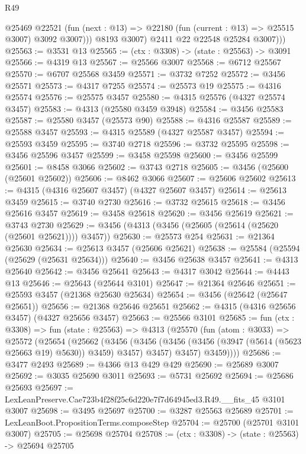 \begin{lexlean}{R49}
\begin{coremodule}
                @25469
                @22521
                (fun (next : @13) => @22180 (fun (current : @13) => @25515 @3007) @3092 @3007)))
            @8193
            @3007)
          @2411
          @22
          @22548
          @25284
          @3007)))
@25563 := @3531 @13
@25565 := (ctx : @3308) -> (state : @25563) -> @3091
@25566 := @4319 @13
@25567 := @25566 @3007
@25568 := @6712 @25567
@25570 := @6707 @25568 @3459
@25571 := @3732 @7252
@25572 := @3456 @25571
@25573 := @4317 @7255
@25574 := @25573 @19
@25575 := @4316 @25574
@25576 := @25575 @3457
@25580 := @4315 @25576 (@4327 @25574 @3457)
@25583 := @4313 (@25580 @3459 @3948)
@25584 := @3456 @25583
@25587 := @25580 @3457 (@25573 @90)
@25588 := @4316 @25587
@25589 := @25588 @3457
@25593 := @4315 @25589 (@4327 @25587 @3457)
@25594 := @25593 @3459
@25595 := @3740 @2718
@25596 := @3732 @25595
@25598 := @3456 @25596 @3457
@25599 := @3458 @25598
@25600 := @3456 @25599
@25601 := @8458 @3066
@25602 := @3743 @2718
@25605 := @3456 (@25600 (@25601 @25602))
@25606 := @8462 @3066
@25607 := @25606 @25602
@25613 := @4315 (@4316 @25607 @3457) (@4327 @25607 @3457)
@25614 := @25613 @3459
@25615 := @3740 @2730
@25616 := @3732 @25615
@25618 := @3456 @25616 @3457
@25619 := @3458 @25618
@25620 := @3456 @25619
@25621 := @3743 @2730
@25629 := @3456 (@4313 (@3456 (@25605 (@25614 (@25620 (@25601 @25621)))) @3457))
@25630 := @25573 @254
@25631 := @21364 @25630
@25634 := @25613 @3457 (@25606 @25621)
@25638 := @25584 (@25594 (@25629 (@25631 @25634)))
@25640 := @3456 @25638 @3457
@25641 := @4313 @25640
@25642 := @3456 @25641
@25643 := @4317 @3042
@25644 := @4443 @13
@25646 := @25643 (@25644 @3101)
@25647 := @21364 @25646
@25651 := @25593 @3457 (@21368 @25630 @25634)
@25654 := @3456 (@25642 (@25647 @25651))
@25656 := @21368 @25646 @25651
@25662 := @4315 (@4316 @25656 @3457) (@4327 @25656 @3457)
@25663 := @25566 @3101
@25685 := fun (ctx : @3308) =>
  fun (state : @25563) =>
  @4313
    (@25570
      (fun (atom : @3033) =>
      @25572
        (@25654
          (@25662
            (@3456
              (@3456 (@3456 (@3456 (@3947 (@5614 (@5623 @25663 @19) @5630)) @3459) @3457) @3457)
              @3457)
            @3459))))
@25686 := @3477 @2493
@25689 := @4366 @13 @429 @429
@25690 := @25689 @3007
@25692 := @3035 @25690 @3011
@25693 := @5731 @25692
@25694 := @25686 @25693
@25697 := LexLeanPreserve.Cae723b4f28f25c6d220e7f7d64945ed3.R49.__fits_45 @3101 @3007
@25698 := @3495 @25697
@25700 := @3287 @25563 @25689
@25701 := LexLeanBoot.PropositionTerms.composeStep
@25704 := @25700 (@25701 @3101 @3007)
@25705 := @25698 @25704
@25708 := (ctx : @3308) -> (state : @25563) -> @25694 @25705

\end{coremodule}
\end{lexlean}
